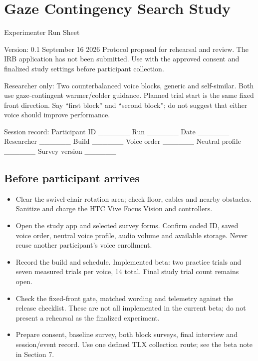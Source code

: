\section{Gaze Contingency Search
Study}\label{gaze-contingency-search-study}

Experimenter Run Sheet

Version: 0.1 \textbar{} September 16 2026 \textbar{} Protocol proposal
for rehearsal and review. The IRB application has not been submitted.
Use with the approved consent and finalized study settings before
participant collection.

Researcher only: Two counterbalanced voice blocks, generic and
self-similar. Both use gaze-contingent warmer/colder guidance. Planned
trial start is the same fixed front direction. Say ``first block'' and
``second block''; do not suggest that either voice should improve
performance.

Session record: Participant ID \_\_\_\_\_\_ Run \_\_\_\_\_\_ Date
\_\_\_\_\_\_ Researcher \_\_\_\_\_\_ Build \_\_\_\_\_\_ Voice order
\_\_\_\_\_\_ Neutral profile \_\_\_\_\_\_ Survey version \_\_\_\_\_\_

\subsection{Before participant
arrives}\label{before-participant-arrives}

\begin{itemize}
\item
  Clear the swivel-chair rotation area; check floor, cables and nearby
  obstacles. Sanitize and charge the HTC Vive Focus Vision and
  controllers.
\item
  Open the study app and selected survey forms. Confirm coded ID, saved
  voice order, neutral voice profile, audio volume and available
  storage. Never reuse another participant's voice enrollment.
\item
  Record the build and schedule. Implemented beta: two practice trials
  and seven measured trials per voice, 14 total. Final study trial count
  remains open.
\item
  Check the fixed-front gate, matched wording and telemetry against the
  release checklist. These are not all implemented in the current beta;
  do not present a rehearsal as the finalized experiment.
\item
  Prepare consent, baseline survey, both block surveys, final interview
  and session/event record. Use one defined TLX collection route; see
  the beta note in Section 7.
\end{itemize}

